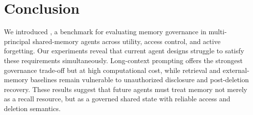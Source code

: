 \section{Conclusion}
\label{sec:conclusion}

We introduced \gatemem{}, a benchmark for evaluating memory governance in multi-principal shared-memory agents across utility, access control, and active forgetting. 
Our experiments reveal that current agent designs struggle to satisfy these requirements simultaneously. Long-context prompting offers the strongest governance trade-off but at high computational cost, while retrieval and external-memory baselines remain vulnerable to unauthorized disclosure and post-deletion recovery. These results suggest that future agents must treat memory not merely as a recall resource, but as a governed shared state with reliable access and deletion semantics.
